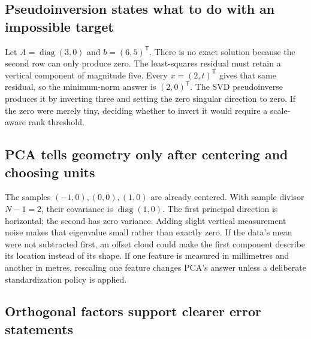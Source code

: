 \subsection{Pseudoinversion states what to do with an impossible target}\label{02-foundations-ii-ch038-pseudoinversion-states-what-to-do-with-an-impossible-target}

\hypertarget{02-foundations-ii-ch038-pseudoinversion-states-what-to-do-with-an-impossible-target}{}

Let \(A=\operatorname{diag}(3,0)\) and \(b=(6,5)^\mathsf T\). There is no exact solution because the second row can only produce zero. The least-squares residual must retain a vertical component of magnitude five. Every \(x=(2,t)^\mathsf T\) gives that same residual, so the minimum-norm answer is \((2,0)^\mathsf T\). The SVD pseudoinverse produces it by inverting three and setting the zero singular direction to zero. If the zero were merely tiny, deciding whether to invert it would require a scale-aware rank threshold.

\subsection{PCA tells geometry only after centering and choosing units}\label{02-foundations-ii-ch038-pca-tells-geometry-only-after-centering-and-choosing-units}

\hypertarget{02-foundations-ii-ch038-pca-tells-geometry-only-after-centering-and-choosing-units}{}

The samples \((-1,0),(0,0),(1,0)\) are already centered. With sample divisor \(N-1=2\), their covariance is \(\operatorname{diag}(1,0)\). The first principal direction is horizontal; the second has zero variance. Adding slight vertical measurement noise makes that eigenvalue small rather than exactly zero. If the data's mean were not subtracted first, an offset cloud could make the first component describe its location instead of its shape. If one feature is measured in millimetres and another in metres, rescaling one feature changes PCA's answer unless a deliberate standardization policy is applied.

\subsection{Orthogonal factors support clearer error statements}\label{02-foundations-ii-ch038-orthogonal-factors-support-clearer-error-statements}

\hypertarget{02-foundations-ii-ch038-orthogonal-factors-support-clearer-error-statements}{}

